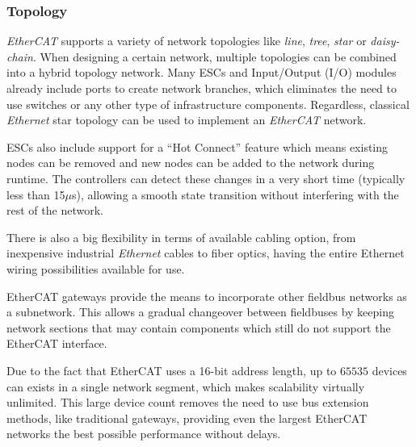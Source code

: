 \subsubsection{Topology}

\emph{EtherCAT} supports a variety of network topologies like \emph{line}, \emph{tree}, \emph{star} or \emph{daisy-chain}.
When designing a certain network, multiple topologies can be combined into a hybrid topology network.
Many ESCs and Input/Output (I/O) modules already include ports to create network branches, which eliminates the need to use switches or any other type of infrastructure components.
Regardless, classical \emph{Ethernet} star topology can be used to implement an \emph{EtherCAT} network.

ESCs also include support for a ``Hot Connect'' feature which means existing nodes can be removed and new nodes can be added to the network during runtime.
The controllers can detect these changes in a very short time (typically less than 15$\mu$s), allowing a smooth state transition without interfering with the rest of the network.

There is also a big flexibility in terms of available cabling option, from inexpensive industrial \emph{Ethernet} cables to fiber optics, having the entire Ethernet wiring possibilities available for use.

EtherCAT gateways provide the means to incorporate other fieldbus networks as a subnetwork.
This allows a gradual changeover between fieldbuses by keeping network sections that may contain components which still do not support the EtherCAT interface.

Due to the fact that EtherCAT uses a 16-bit address length, up to $65535$ devices can exists in a single network segment, which makes scalability virtually unlimited.
This large device count removes the need to use bus extension methods, like traditional gateways, providing even the largest EtherCAT networks the best possible performance without delays.
